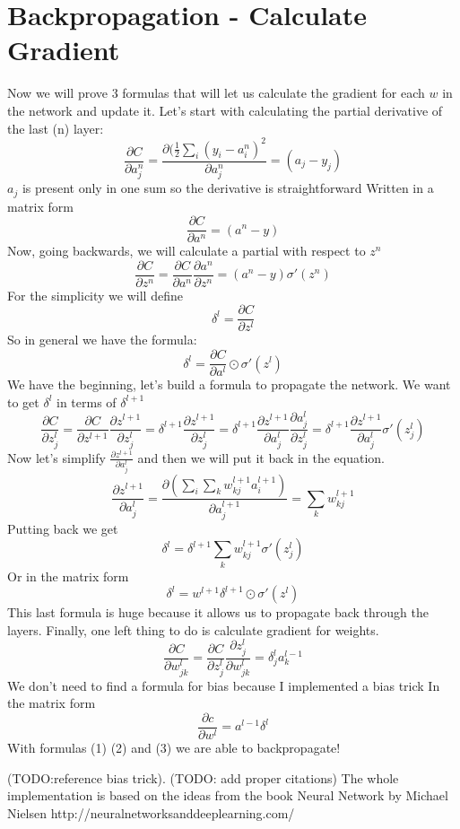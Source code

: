 \documentclass{article}
\begin{document}
\section{Backpropagation - Calculate Gradient}
Now we will prove 3 formulas that will let us calculate the gradient for each $w$ in the network and update it. 
\newline
Let's start with calculating the partial derivative of the last (n) layer:
$$ \frac{\partial C}{\partial a_j^n} = \frac{\partial(\frac{1}{2}\sum_i (y_i - a_i^n)^2 }{\partial a_j^n} = (a_j - y_j) $$
$a_j$ is present only in one sum so the derivative is straightforward
\newline
Written in a matrix form
$$ \frac{\partial C}{\partial a^n} = (a^n - y) $$
Now, going backwards, we will calculate a partial with respect to $z^n$
$$ \frac{\partial C}{\partial z^n} = \frac{\partial C}{\partial a^n} \frac{\partial a^n}{\partial z^n} = (a^n-y) \sigma'(z^n) $$
For the simplicity we will define
$$ \delta^l = \frac{\partial C}{\partial z^l}$$
So in general we have the formula:
\begin{equation}
\delta^l = \frac{\partial C}{\partial a^l} \odot \sigma'(z^l)
\end{equation}
\newline
We have the beginning, let's build a formula to propagate the network.
We want to get $\delta^l$ in terms of $\delta^{l+1}$
$$ \frac{\partial C}{\partial z_j^l} = \frac{\partial C}{\partial z^{l+1} } \frac{\partial z^{l+1}} {\partial z^l_j} = \delta ^{l+1} \frac{\partial z^{l+1}}{\partial z^l_j}  = \delta ^{l+1}
\frac{\partial z^{l+1}}{\partial a^l_j} \frac{\partial a_j^l}{\partial z^l_j} =  \delta ^{l+1}
\frac{\partial z^{l+1}}{\partial a^l_j} \sigma'(z_j^l)$$
Now let's simplify $\frac{\partial z^{l+1}}{\partial a^l_j}$ and then we will put it back in the equation.
$$ \frac{\partial z^{l+1}}{\partial a^l_j} = 
\frac{\partial(\sum_i \sum_k w_{kj}^{l+1} a_i^{l+1})}{\partial a_j^{l+1}} = \sum_k w_{kj}^{l+1}
$$
Putting back we get 
$$\delta ^{l} = \delta ^{l+1}
\sum_k w_{kj}^{l+1} \sigma'(z_j^l)$$ 
Or in the matrix form
\begin{equation}
    \delta^l = w^{l+1} \delta^{l+1} \odot \sigma'(z^l) 
\end{equation}
This last formula is huge because it allows us to propagate back through the layers.
\newline
Finally, one left thing to do is calculate gradient for weights.
$$ \frac{\partial C}{\partial w_{jk}^l} = \frac{\partial C}{\partial z_j^l} \frac{\partial z_j^l}{\partial w_{jk}^l} = \delta_j^l a_k^{l-1}$$
We don't need to find a formula for bias because I implemented a bias trick 
In the matrix form
\begin{equation}
\frac{\partial c}{\partial w^l} = a^{l-1} \delta^l
\end{equation}
With formulas (1) (2) and (3) we are able to backpropagate!



(TODO:reference bias trick).
(TODO: add proper citations)
The whole implementation is based on the ideas from the book
Neural Network by Michael Nielsen
http://neuralnetworksanddeeplearning.com/
\end{document}

